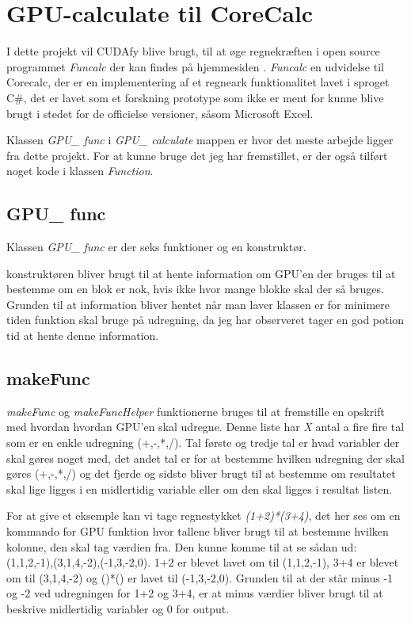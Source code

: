 \section{GPU-calculate til CoreCalc}
I dette projekt vil CUDAfy blive brugt, til at øge regnekræften i open source programmet \textit{Funcalc} der kan findes på hjemmesiden \cite{FuncalcHome}.
\textit{Funcalc} en udvidelse til Corecalc, der er en implementering af et regneark funktionalitet lavet i sproget C\#, det er lavet som et forskning prototype som ikke er ment for kunne blive brugt i stedet for de officielse versioner, såsom Microsoft Excel.

Klassen \textit{GPU\_ func} i \textit{GPU\_ calculate} mappen er hvor det meste arbejde ligger fra dette projekt. For at kunne bruge det jeg har fremstillet, er der også tilført noget kode i klassen \textit{Function}.

\subsection{GPU\_ func}
Klassen \textit{GPU\_ func} er der seks funktioner og en konstruktør.

konstruktøren bliver brugt til at hente information om GPU'en der bruges til at bestemme om en blok er nok, hvis ikke hvor mange blokke skal der så bruges. Grunden til at information bliver hentet når man laver klassen er for minimere tiden funktion skal bruge på udregning, da jeg har observeret tager en god potion tid at hente denne information.

\subsection{makeFunc}
\textit{makeFunc} og \textit{makeFuncHelper} funktionerne bruges til at fremstille en opskrift med hvordan hvordan GPU'en skal udregne. Denne liste har \textit{X} antal a fire fire tal som er en enkle udregning (+,-,*,/). Tal første og tredje tal er hvad variabler der skal gøres noget med, det andet tal er for at bestemme hvilken udregning der skal gøres (+,-,*,/) og det fjerde og sidste bliver brugt til at bestemme om resultatet skal lige ligges i en midlertidig variable eller om den skal ligges i resultat listen.

For at give et eksemple kan vi tage regnestykket \textit{(1+2)*(3+4)}, det her ses om en kommando for GPU funktion hvor tallene bliver brugt til at bestemme hvilken kolonne, den skal tag værdien fra. Den kunne komme til at se sådan ud: (1,1,2,-1),(3,1,4,-2),(-1,3,-2,0). 1+2 er blevet lavet om til (1,1,2,-1), 3+4 er blevet om til (3,1,4,-2) og ()*() er lavet til (-1,3,-2,0). Grunden til at der står minus -1 og -2 ved udregningen for 1+2 og 3+4, er at minus værdier bliver brugt til at beskrive midlertidig variabler og 0 for output.

